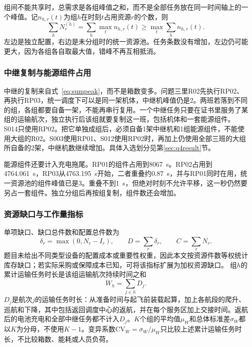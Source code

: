 组间不能共享时，总需求是各组峰值之和，而不是全部任务放在同一时间轴上的一个峰值。记$n_{h,r}(t)$为组$h$在时刻$t$占用资源$r$的个数，则
\begin{equation}
\sum_h N_r^{(h)}
=\sum_h\max_t n_{h,r}(t)
\ge\max_t\sum_h n_{h,r}(t).
\label{eq:sumpeak}
\end{equation}
左边是独立配置，右边是未分组时的统一资源池。任务条数没有增加，左边仍可能更大，因为各组各自取最大值，错峰不再互相抵消。

\subsubsection{中继复制与能源组件占用}

中继的复制来自式~\eqref{eq:sumpeak}，而不是箱数变多。问题三里R02先执行RP02、再执行RP03，统一调度下可以是同一架机体，中继机峰值仍是2。两班若落到不同的组，各组都要自备一架，不能再串行复用。一个中继任务只要在证书里服务了某组的运输航次，独立执行后该组就要复制这一班，包括机体和一套能源组件。S014只使用RP02。把它单独成组后，必须自备1架中继机和1组能源组件，不能使用大组的R02。S003使用RP01、S012使用RP02时，再加上仍使用全部三班的大组所自备的2架，中继机数继续增加。具体入选划分见第\ref{sec:q4result}节。

能源组件还要计入充电拖尾。RP01的组件占用到8067~s。RP02占用到4764.061~s，RP03从4763.195~s开始，二者重叠约0.87~s，并与RP01同时在用，统一资源池的组件峰值已是3。重叠不到1~s，但绝对时刻不允许平移，这一秒仍然要另占一套组件。独立分组后再按组复制，组件数还会增加。

\subsubsection{资源缺口与工作量指标}

单项缺口、缺口总件数和配置总件数为
\begin{equation}
\delta_r=\max(0,N_r-I_r),\qquad
D=\sum_r\delta_r,\qquad
C=\sum_r N_r.
\label{eq:shortage}
\end{equation}
题目未给出不同类型设备的配置成本或重要性权重，因此本文按资源件数等权统计库存缺口；若实际采购或保障成本已知，可将该指标扩展为加权资源缺口。
组$h$的累计运输任务时长是该组运输航次持续时间之和
\begin{equation}
W_h=\sum_{j\in h}D_j.
\label{eq:work}
\end{equation}
$D_j$是航次$j$的运输任务时长：从准备时间与起飞前装载起算，加上各航段的爬升、巡航和下降，其中包括返回调度中心的返航，并在每个服务区加上交接时间。返航后的电池充电和全部中继任务都不计入$D_j$。$K$个组的平均值$\mu_W$和总体标准差$\sigma_W$都以$K$为分母，不使用$K-1$。变异系数$\mathrm{CV}_W=\sigma_W/\mu_W$只比较上述累计运输任务时长，不比较箱数、能耗或人员负荷。

